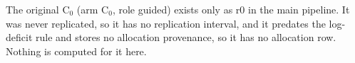 The original C$_0$ (arm C$_0$, role guided) exists only as r0 in the main pipeline. It was never replicated, so it has no replication interval, and it predates the log-deficit rule and stores no allocation provenance, so it has no allocation row. Nothing is computed for it here.
